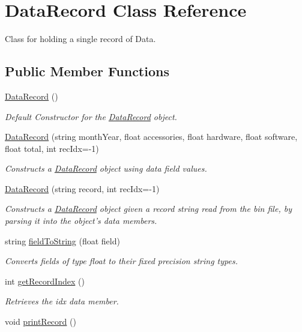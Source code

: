 \hypertarget{classDataRecord}{\section{Data\-Record Class Reference}
\label{classDataRecord}
}


Class for holding a single record of Data.  


\subsection*{Public Member Functions}
\begin{DoxyCompactItemize}
\item 
\hypertarget{classDataRecord_ad93a5bf8b22613e9723e98251dad7912}{\hyperlink{classDataRecord_ad93a5bf8b22613e9723e98251dad7912}{Data\-Record} ()}\label{classDataRecord_ad93a5bf8b22613e9723e98251dad7912}

\begin{DoxyCompactList}\small\item\em Default Constructor for the \hyperlink{classDataRecord}{Data\-Record} object. \end{DoxyCompactList}\item 
\hyperlink{classDataRecord_a8e7efc362d0c64ca189f9ac2abd56e8e}{Data\-Record} (string month\-Year, float accessories, float hardware, float software, float total, int rec\-Idx=-\/1)
\begin{DoxyCompactList}\small\item\em Constructs a \hyperlink{classDataRecord}{Data\-Record} object using data field values. \end{DoxyCompactList}\item 
\hyperlink{classDataRecord_ae0b2d3655024922143f35a022d9d965b}{Data\-Record} (string record, int rec\-Idx=-\/1)
\begin{DoxyCompactList}\small\item\em Constructs a \hyperlink{classDataRecord}{Data\-Record} object given a record string read from the bin file, by parsing it into the object's data members. \end{DoxyCompactList}\item 
string \hyperlink{classDataRecord_a2f5721666868ded376f3edff99cfb1b9}{field\-To\-String} (float field)
\begin{DoxyCompactList}\small\item\em Converts fields of type float to their fixed precision string types. \end{DoxyCompactList}\item 
int \hyperlink{classDataRecord_a0f679d9af4ac1a0f1ad0017c08b88278}{get\-Record\-Index} ()
\begin{DoxyCompactList}\small\item\em Retrieves the idx data member. \end{DoxyCompactList}\item 
\hypertarget{classDataRecord_a601e4f559dfece4c61d2982bc01165b4}{void \hyperlink{classDataRecord_a601e4f559dfece4c61d2982bc01165b4}{print\-Record} ()}\label{classDataRecord_a601e4f559dfece4c61d2982bc01165b4}


\end{DoxyCompactItemize}

